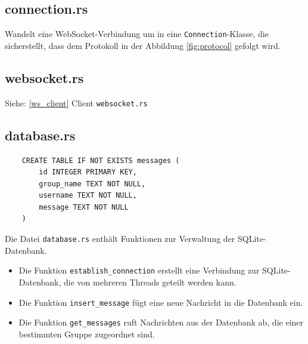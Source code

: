\documentclass[a4paper]{article}
\begin{document}
\subsection{connection.rs}

Wandelt eine WebSocket-Verbindung um in eine \texttt{Connection}-Klasse, die sicherstellt, dass dem Protokoll in der Abbildung \ref{fig:protocol} gefolgt wird.

\subsection{websocket.rs}

Siehe: \ref{ws_client} Client \texttt{websocket.rs}


\subsection{database.rs}


\begin{verbatim}
    CREATE TABLE IF NOT EXISTS messages (
        id INTEGER PRIMARY KEY,
        group_name TEXT NOT NULL,
        username TEXT NOT NULL,
        message TEXT NOT NULL
    )
\end{verbatim}


Die Datei \texttt{database.rs} enthält Funktionen zur Verwaltung der SQLite-Datenbank.




\begin{itemize}
    \item Die Funktion \texttt{establish\_connection} erstellt eine Verbindung zur SQLite-Datenbank, die von mehreren Threads geteilt werden kann.
    \item Die Funktion \texttt{insert\_message} fügt eine neue Nachricht in die Datenbank ein.
    \item Die Funktion \texttt{get\_messages} ruft Nachrichten aus der Datenbank ab, die einer bestimmten Gruppe zugeordnet sind.
\end{itemize}
\end{document}
